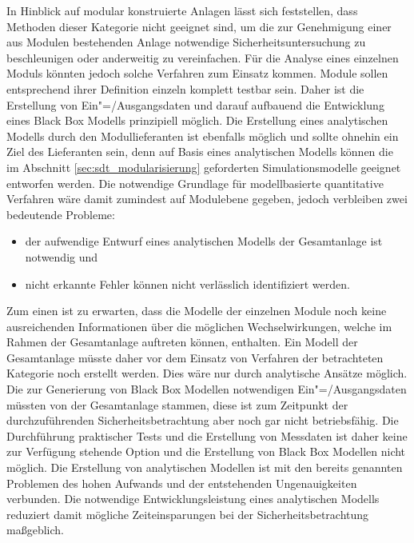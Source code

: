 In Hinblick auf modular konstruierte Anlagen l\"asst sich feststellen, dass Methoden dieser Kategorie nicht geeignet sind, um die zur Genehmigung einer aus Modulen bestehenden Anlage notwendige Sicherheitsuntersuchung zu beschleunigen oder anderweitig zu vereinfachen. \newline
F\"ur die Analyse eines einzelnen Moduls k\"onnten jedoch solche Verfahren zum Einsatz kommen. Module sollen entsprechend ihrer Definition einzeln komplett testbar sein. Daher ist die Erstellung von Ein"=/Ausgangsdaten und darauf aufbauend die Entwicklung eines Black Box Modells prinzipiell m\"oglich. Die Erstellung eines analytischen Modells durch den Modullieferanten ist ebenfalls m\"oglich und sollte ohnehin ein Ziel des Lieferanten sein, denn auf Basis eines analytischen Modells k\"onnen die im Abschnitt \ref{sec:sdt_modularisierung} geforderten Simulationsmodelle geeignet entworfen werden. Die notwendige Grundlage f\"ur modellbasierte quantitative Verfahren w\"are damit zumindest auf Modulebene gegeben, jedoch verbleiben zwei bedeutende Probleme: \begin{itemize}
\item der aufwendige Entwurf eines analytischen Modells der Gesamtanlage ist notwendig und
\item nicht erkannte Fehler k\"onnen nicht verl\"asslich identifiziert werden.
\end{itemize}
Zum einen ist zu erwarten, dass die Modelle der einzelnen Module noch keine ausreichenden Informationen \"uber die m\"oglichen Wechselwirkungen, welche im Rahmen der Gesamtanlage auftreten k\"onnen, enthalten. Ein Modell der Gesamtanlage m\"usste daher vor dem Einsatz von Verfahren der betrachteten Kategorie noch erstellt werden. Dies w\"are nur durch analytische Ans\"atze m\"oglich. Die zur Generierung von Black Box Modellen notwendigen Ein"=/Ausgangsdaten m\"ussten von der Gesamtanlage stammen, diese ist zum Zeitpunkt der durchzuf\"uhrenden Sicherheitsbetrachtung aber noch gar nicht betriebsf\"ahig. Die Durchf\"uhrung praktischer Tests und die Erstellung von Messdaten ist daher keine zur Verf\"ugung stehende Option und die Erstellung von Black Box Modellen nicht m\"oglich. Die Erstellung von analytischen Modellen ist mit den bereits genannten Problemen des hohen Aufwands und der entstehenden Ungenauigkeiten verbunden. Die notwendige Entwicklungsleistung eines analytischen Modells reduziert damit m\"ogliche Zeiteinsparungen bei der Sicherheitsbetrachtung ma\ss{}geblich. \newline
